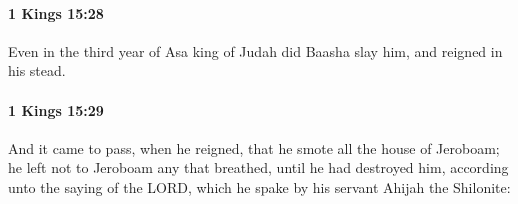		\paragraph{1 Kings 15:28} %
			\label{1KINGS-15-28}

			Even in the third year of Asa king of Judah did Baasha slay him, and reigned in his stead.


		\paragraph{1 Kings 15:29} %
			\label{1KINGS-15-29}

			And it came to pass, when he reigned, that he smote all the house of Jeroboam; he left not to Jeroboam any that breathed, until he had destroyed him, according unto the saying of the LORD, which he spake by his servant Ahijah the Shilonite:


